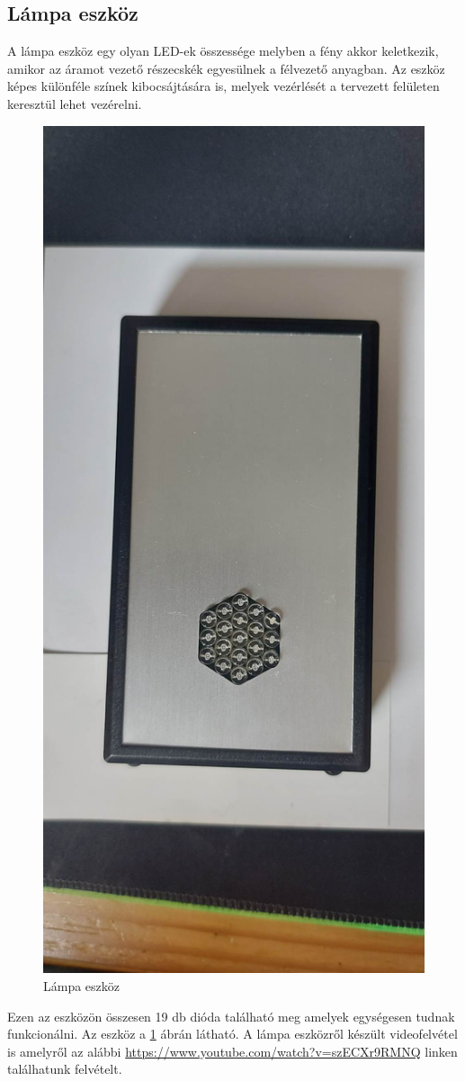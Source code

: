 \documentclass[tocnopagenum]{thesis-ekf}
\theoremstyle{definition}
\theoremstyle{remark}
\begin{document}
	\subsection{Lámpa eszköz}
	A lámpa eszköz egy olyan LED-ek összessége melyben a fény akkor keletkezik, amikor az áramot vezető részecskék egyesülnek a félvezető anyagban. Az eszköz képes különféle színek kibocsájtására is, melyek vezérlését a tervezett felületen keresztül lehet vezérelni.
	\begin{figure}[H]	
		\centering
		\includegraphics[scale=0.10]{lamp01}
		\caption[Lámpa eszköz]{Lámpa eszköz}
		\label{fig:lamp01}
	\end{figure}
	Ezen az eszközön összesen 19 db dióda található meg amelyek egységesen tudnak funkcionálni. 
	Az eszköz a \ref{fig:lamp01} ábrán látható.
	A lámpa eszközről készült videofelvétel is amelyről az alábbi \url{https://www.youtube.com/watch?v=szECXr9RMNQ} linken találhatunk felvételt.
\end{document}
